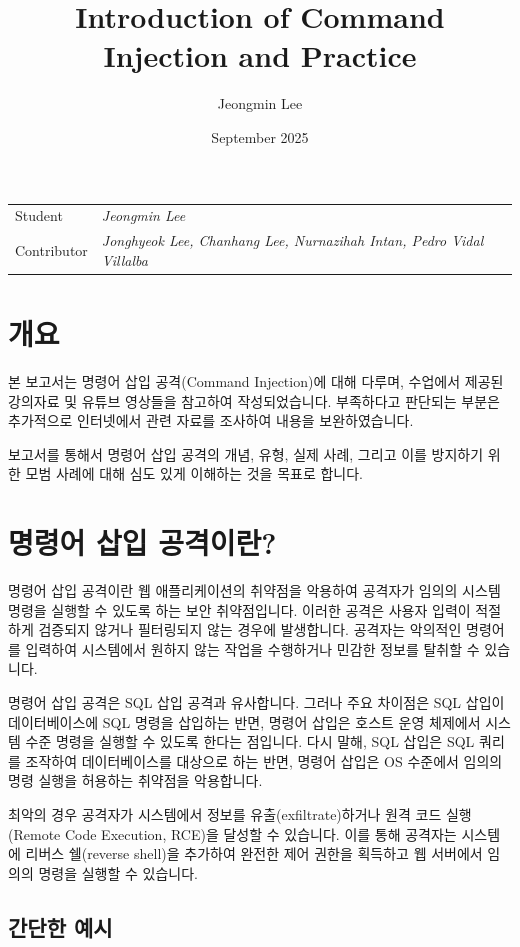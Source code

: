 \documentclass{article}
\title{Introduction of Command Injection and Practice}
\author{Jeongmin Lee}
\date{September 2025}
\begin{document}
\maketitle

\noindent\begin{tabular}{@{}ll}
  Student & \textit{Jeongmin Lee}\\
  Contributor & \textit{Jonghyeok Lee, Chanhang Lee, Nurnazihah Intan, Pedro Vidal Villalba}\\
\end{tabular}

\section*{개요}
본 보고서는 명령어 삽입 공격(Command Injection)에 대해 다루며, 수업에서 제공된 강의자료 및 유튜브 영상들을 참고하여 작성되었습니다.
부족하다고 판단되는 부분은 추가적으로 인터넷에서 관련 자료를 조사하여 내용을 보완하였습니다. 

보고서를 통해서 명령어 삽입 공격의 개념, 유형, 실제 사례, 그리고 이를 방지하기 위한 모범 사례에 대해 심도 있게 이해하는 것을 목표로 합니다.

\section*{명령어 삽입 공격이란?}
명령어 삽입 공격이란 웹 애플리케이션의 취약점을 악용하여 공격자가 임의의 시스템 명령을 실행할 수 있도록 하는 보안 취약점입니다.
이러한 공격은 사용자 입력이 적절하게 검증되지 않거나 필터링되지 않는 경우에 발생합니다. 
공격자는 악의적인 명령어를 입력하여 시스템에서 원하지 않는 작업을 수행하거나 민감한 정보를 탈취할 수 있습니다.

명령어 삽입 공격은 SQL 삽입 공격과 유사합니다. 그러나 주요 차이점은 SQL 삽입이 데이터베이스에 SQL 명령을 삽입하는 반면, 
명령어 삽입은 호스트 운영 체제에서 시스템 수준 명령을 실행할 수 있도록 한다는 점입니다. 
다시 말해, SQL 삽입은 SQL 쿼리를 조작하여 데이터베이스를 대상으로 하는 반면, 명령어 삽입은 OS 수준에서 임의의 명령 실행을 허용하는 취약점을 악용합니다.

최악의 경우 공격자가 시스템에서 정보를 유출(exfiltrate)하거나 원격 코드 실행(Remote Code Execution, RCE)을 달성할 수 있습니다.
이를 통해 공격자는 시스템에 리버스 쉘(reverse shell)을 추가하여 완전한 제어 권한을 획득하고 웹 서버에서 임의의 명령을 실행할 수 있습니다.

\subsection*{간단한 예시}
\end{document}
